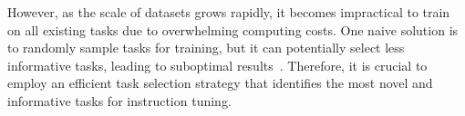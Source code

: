 However, as the scale of datasets grows rapidly, it becomes impractical to train on all existing tasks due to overwhelming computing costs. 
One naive solution is to randomly sample tasks for training, but it can potentially select less informative tasks, leading to suboptimal results~\cite{wang2023far}.
Therefore, it is crucial to employ an efficient task selection strategy that identifies the most novel and informative tasks for instruction tuning.



